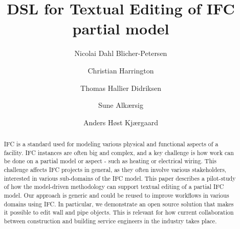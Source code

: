 \documentclass[oribibl]{llncs}
\begin{document}

\mainmatter              %
\title{DSL for Textual Editing of IFC partial model}

\author{Nicolai Dahl Blicher-Petersen \and Christian Harrington \and
Thomas Hallier Didriksen \and Sune Alkærsig \and Anders Høst Kjærgaard\\
}



\maketitle              %

\begin{abstract}
IFC is a standard used for modeling various physical and functional aspects of a facility. IFC instances are often big and complex, and a key challenge is how work can be done on a partial model or aspect - such as heating or electrical wiring. This challenge affects IFC projects in general, as they often involve various stakeholders, interested in various sub-domains of the IFC model. This paper describes a pilot-study of how the model-driven methodology can support textual editing of a partial IFC model. Our approach is generic and could be reused to improve workflows in various domains using IFC. In particular, we demonstrate an open source solution that  makes it possible to edit wall and pipe objects. This is relevant for how current collaboration between construction and building service engineers in the industry takes place.

\end{abstract}











\end{document}
